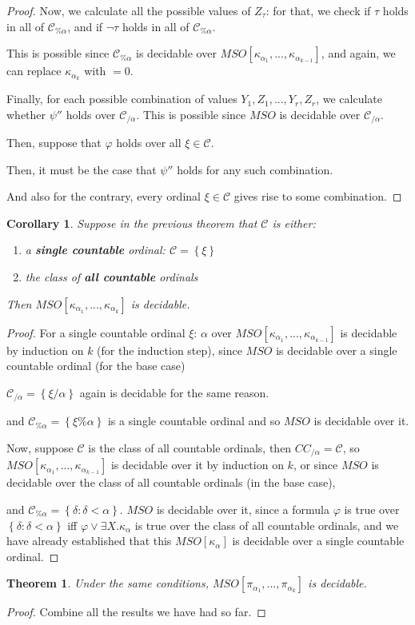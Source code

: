 \documentclass{article}
\newtheorem{theorem}{Theorem}
\newtheorem{corollary}{Corollary}
\newcommand{\brackets}[1]{\left[ {#1} \right]}
\newcommand{\braces}[1]{\left\{ {#1} \right\}}
\newcommand{\setcomp}[1]{\braces{#1}}
\newcommand{\kk}[1]{{\kappa}_{#1}}
\newcommand{\pp}[1]{{\pi}_{#1}}
\newcommand{\CC}{\mathcal{C}}
\begin{document}
\begin{proof}
    Now, we calculate all the possible values of $Z_\tau$: for that,
    we check if $\tau$ holds in all of $\CC_{\% \alpha}$, and if
    $\neg \tau$ holds in all of $\CC_{\% \alpha}$.

    This is possible since $\CC_{\% \alpha}$ is decidable over $MSO \brackets{\kk{\alpha_1}, ..., \kk{\alpha_{k-1}}}$,
    and again, we can replace $\kk{\alpha_k}$ with $=0$.

    Finally, for each possible combination of values
    $Y_1, Z_1, ..., Y_r, Z_r$, we calculate whether $\psi''$ holds over
    $\CC_{/\alpha}$. This is possible since $MSO$ is decidable over $\CC_{/\alpha}$.
    

    Then, suppose that $\varphi$ holds over all $\xi \in \CC$.

    Then, it must be the case that
    $\psi''$ holds for any such combination. 

    And also for the contrary, every ordinal $\xi \in \CC$ gives rise to some combination.
\end{proof}

\begin{corollary}
    Suppose in the previous theorem that $\CC$ is either:
    \begin{enumerate}
        \item a \textbf{single countable} ordinal: $\CC = \setcomp{\xi}$
        \item the class of \textbf{all countable} ordinals
    \end{enumerate}
    Then $MSO \brackets{\kk{\alpha_1}, ..., \kk{\alpha_k}}$ is decidable.
\end{corollary}

\begin{proof}
    For a single countable ordinal $\xi$:
    $\alpha$ over $MSO \brackets{\kk{\alpha_1}, ..., \kk{\alpha_{k-1}}}$
    is decidable by induction on $k$ (for the induction step),
    since $MSO$ is decidable over a single countable ordinal (for the base case)

    $\CC_{/\alpha} = \setcomp{\xi/\alpha}$ again is decidable for the same reason.

    and $\CC_{\% \alpha} = \setcomp{\xi \% \alpha}$ 
    is a single countable ordinal and so $MSO$ is decidable over it.


    Now, suppose $\CC$ is the class of all countable ordinals,
    then $CC_{/ \alpha} = \CC$,
    so $MSO \brackets{\kk{\alpha_1}, ..., \kk{\alpha_{k-1}}}$ is decidable
    over it by induction on $k$, or since $MSO$ is decidable over
    the class of all countable ordinals (in the base case),

    and $\CC_{\% \alpha} = \setcomp{\delta : \delta < \alpha}$.
    $MSO$ is decidable over it, since a formula
    $\varphi$ is true over $\setcomp{\delta : \delta < \alpha}$
    iff $\varphi \vee \exists X. \kk{\alpha}$ is true over the class
    of all countable ordinals, and we have already established that
    this $MSO \brackets{\kk{\alpha}}$ is decidable over a single countable ordinal.
\end{proof}

\begin{theorem}
    Under the same conditions, $MSO \brackets{\pp{\alpha_1}, ..., \pp{\alpha_k}}$ is decidable.
\end{theorem}

\begin{proof}
    Combine all the results we have had so far.
\end{proof}
\end{document}
